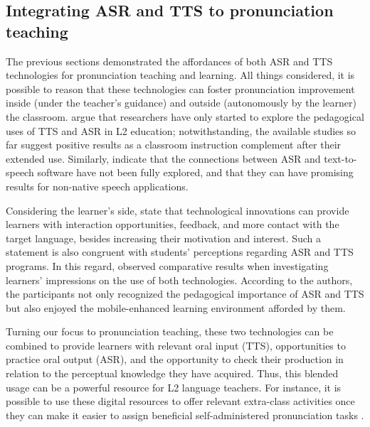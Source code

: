 \documentclass[english]{textolivre}
\begin{document}
\subsection{Integrating ASR and TTS to pronunciation teaching}\label{sec-modelo}
The previous sections demonstrated the affordances of both ASR and TTS technologies for pronunciation teaching and learning. All things considered, it is possible to reason that these technologies can foster pronunciation improvement inside (under the teacher's guidance) and outside (autonomously by the learner) the classroom. \textcite{liakin_mobilizing_2017} argue that researchers have only started to explore the pedagogical uses of TTS and ASR in L2 education; notwithstanding, the available studies so far suggest positive results as a classroom instruction complement after their extended use. Similarly, \textcite{levis_2013} indicate that the connections between ASR and text-to-speech software have not been fully explored, and that they can have promising results for non-native speech applications.

Considering the learner’s side, \textcite{golonka_technologies_2014} state that technological innovations can provide learners with interaction opportunities, feedback, and more contact with the target language, besides increasing their motivation and interest. Such a statement is also congruent with students’ perceptions regarding ASR and TTS programs. In this regard, \textcite{liakin_mobilizing_2017} observed comparative results when investigating learners' impressions on the use of both technologies. According to the authors, the participants not only recognized the pedagogical importance of ASR and TTS but also enjoyed the mobile-enhanced learning environment afforded by them.

Turning our focus to pronunciation teaching, these two technologies can be combined to provide learners with relevant oral input (TTS), opportunities to practice oral output (ASR), and the opportunity to check their production in relation to the perceptual knowledge they have acquired. Thus, this blended usage can be a powerful resource for L2 language teachers. For instance, it is possible to use these digital resources to offer relevant extra-class activities once they can make it easier to assign beneficial self-administered pronunciation tasks \cite{munro_2015}.
\end{document}
